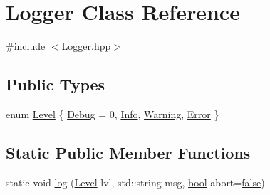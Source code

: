 \hypertarget{class_logger}{\section{Logger Class Reference}
\label{class_logger}
}


{\ttfamily \#include $<$Logger.\-hpp$>$}

\subsection*{Public Types}
\begin{DoxyCompactItemize}
\item 
enum \hyperlink{class_logger_ad766a24576ea8b27ad9d5649cef46d8f}{Level} \{ \hyperlink{class_logger_ad766a24576ea8b27ad9d5649cef46d8fa56db48fa2adaf90cde424c8ecfb8e5e1}{Debug} = 0, 
\hyperlink{class_logger_ad766a24576ea8b27ad9d5649cef46d8fa9f3354efabc848dcb9ddf68279b7417b}{Info}, 
\hyperlink{class_logger_ad766a24576ea8b27ad9d5649cef46d8fa77a6bb9c2e4acdedd73247b641a61778}{Warning}, 
\hyperlink{class_logger_ad766a24576ea8b27ad9d5649cef46d8faf38b93fc7958d816f1e769f264632e68}{Error}
 \}
\end{DoxyCompactItemize}
\subsection*{Static Public Member Functions}
\begin{DoxyCompactItemize}
\item 
static void \hyperlink{class_logger_a08b2ced31265dc5a73986665f78459ac}{log} (\hyperlink{class_logger_ad766a24576ea8b27ad9d5649cef46d8f}{Level} lvl, std\-::string msg, \hyperlink{term__entry_8h_a002004ba5d663f149f6c38064926abac}{bool} abort=\hyperlink{_snake_8cpp_ae6c865df784842196d411c1466b01686}{false})
\end{DoxyCompactItemize}


